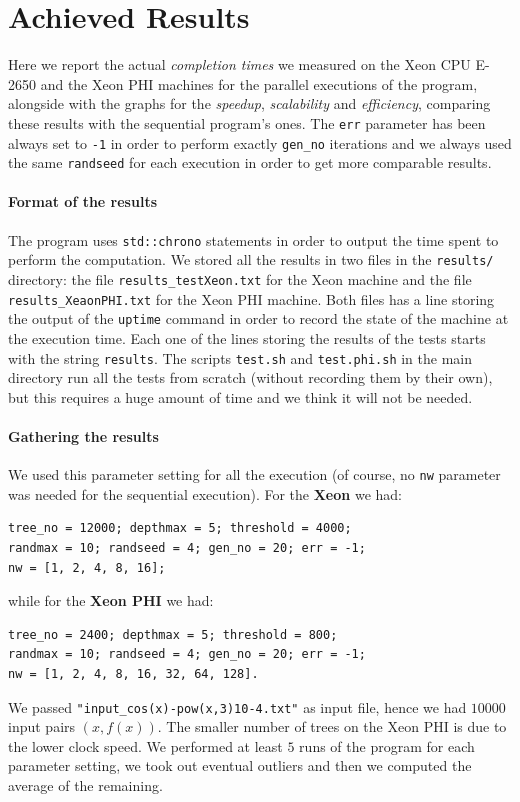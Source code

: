 \documentclass[10pt]{article}
\numberwithin{equation}{section}
\begin{document}
\section{Achieved Results}
Here we report the actual \emph{completion times} we measured on the Xeon CPU E-2650 and the Xeon PHI machines for the parallel executions of the program, alongside with the graphs for the \emph{speedup}, \emph{scalability} and \emph{efficiency}, comparing these results with the sequential program's ones. The \verb|err| parameter has been always set to \verb|-1| in order to perform exactly \verb|gen_no| iterations and we always used the same \verb|randseed| for each execution in order to get more comparable results.
\paragraph{Format of the results}
The program uses \verb|std::chrono| statements in order to output the time spent to perform the computation. We stored all the results in two files in the \verb|results/| directory: the file \verb|results_testXeon.txt| for the Xeon machine and the file \verb|results_XeaonPHI.txt| for the Xeon PHI machine. Both files has a line storing the output of the \verb|uptime| command in order to record the state of the machine at the execution time. Each one of the lines storing the results of the tests starts with the string \verb|results|. The scripts \verb|test.sh| and \verb|test.phi.sh| in the main directory run all the tests from scratch (without recording them by their own), but this requires a huge amount of time and we think it will not be needed.
\paragraph{Gathering the results}
We used this parameter setting for all the execution (of course, no \verb|nw| parameter was needed for the sequential execution). For the \textbf{Xeon} we had:
\begin{verbatim}
tree_no = 12000; depthmax = 5; threshold = 4000;
randmax = 10; randseed = 4; gen_no = 20; err = -1;
nw = [1, 2, 4, 8, 16];
\end{verbatim}
while for the \textbf{Xeon PHI} we had:
\begin{verbatim}
tree_no = 2400; depthmax = 5; threshold = 800;
randmax = 10; randseed = 4; gen_no = 20; err = -1;
nw = [1, 2, 4, 8, 16, 32, 64, 128].
\end{verbatim}
We passed \verb|"input_cos(x)-pow(x,3)10-4.txt"| as input file, hence we had $10000$ input pairs $(x, f(x))$. The smaller number of trees on the Xeon PHI is due to the lower clock speed. We performed at least $5$ runs of the program for each parameter setting, we took out eventual outliers and then we computed the average of the remaining.
\end{document}
